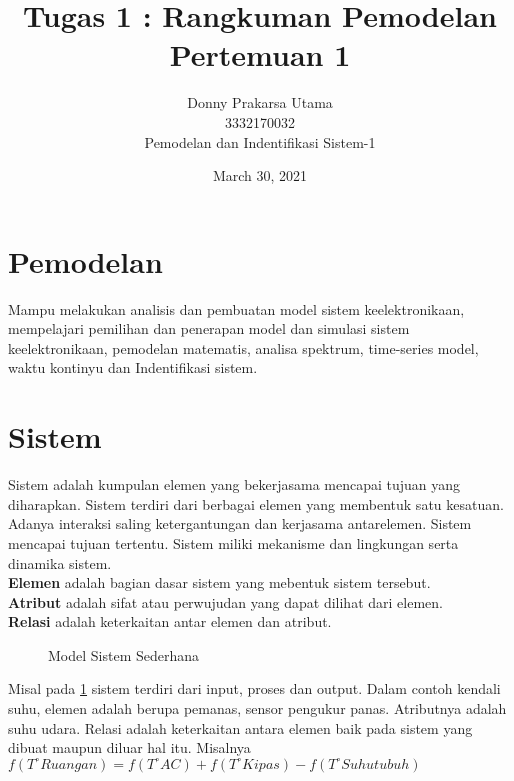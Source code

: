 \documentclass[10pt]{article}
\begin{document}
\title{Tugas 1 : Rangkuman Pemodelan Pertemuan 1}
\author{Donny Prakarsa Utama\\3332170032\\Pemodelan dan Indentifikasi Sistem-1}
\date{March 30, 2021}
\maketitle

\section{Pemodelan}
Mampu melakukan analisis dan pembuatan model sistem keelektronikaan, mempelajari pemilihan dan penerapan model dan simulasi sistem keelektronikaan, pemodelan matematis, analisa spektrum, time-series model, waktu kontinyu dan Indentifikasi sistem. 
\section{Sistem}
Sistem adalah kumpulan elemen yang bekerjasama mencapai tujuan yang diharapkan. Sistem terdiri dari berbagai elemen yang membentuk satu kesatuan. Adanya interaksi saling ketergantungan dan kerjasama antarelemen. Sistem mencapai tujuan tertentu. Sistem miliki mekanisme dan lingkungan serta dinamika sistem.\\ \textbf{Elemen} adalah bagian dasar sistem yang mebentuk sistem tersebut.\\ \textbf{Atribut} adalah sifat atau perwujudan yang dapat dilihat dari elemen. \\ \textbf{Relasi} adalah keterkaitan antar elemen dan atribut.
\begin{figure}
\centering
{}
\caption{Model Sistem Sederhana}
\label{fig:1}
\end{figure}

Misal pada \figurename{\ref{fig:1}} sistem terdiri dari input, proses dan output. Dalam contoh kendali suhu, elemen adalah berupa pemanas, sensor pengukur panas. Atributnya adalah suhu udara. Relasi adalah keterkaitan antara elemen baik pada sistem yang dibuat maupun diluar hal itu. 
Misalnya $f(T^{\circ}Ruangan)=f(T^{\circ}AC)+f(T^{\circ}Kipas)-f(T^{\circ}Suhu tubuh)$
\end{document}
